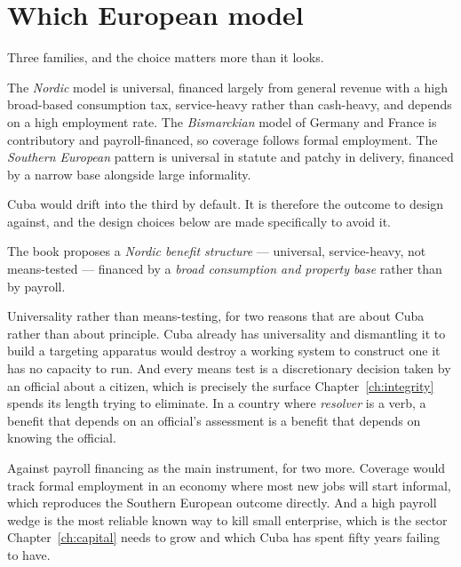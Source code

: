 \section{Which European model}

Three families, and the choice matters more than it looks.

The \emph{Nordic} model is universal, financed largely from general revenue with
a high broad-based consumption tax, service-heavy rather than cash-heavy, and
depends on a high employment rate. The \emph{Bismarckian} model of Germany and
France is contributory and payroll-financed, so coverage follows formal
employment. The \emph{Southern European} pattern is universal in statute and
patchy in delivery, financed by a narrow base alongside large informality.

Cuba would drift into the third by default. It is therefore the outcome to
design against, and the design choices below are made specifically to avoid it.

The book proposes a \emph{Nordic benefit structure} --- universal, service-heavy,
not means-tested --- financed by a \emph{broad consumption and property base}
rather than by payroll.

Universality rather than means-testing, for two reasons that are about Cuba
rather than about principle. Cuba already has universality and dismantling it to
build a targeting apparatus would destroy a working system to construct one it
has no capacity to run. And every means test is a discretionary decision taken
by an official about a citizen, which is precisely the surface
Chapter~\ref{ch:integrity} spends its length trying to eliminate. In a country
where \emph{resolver} is a verb, a benefit that depends on an official's
assessment is a benefit that depends on knowing the official.

Against payroll financing as the main instrument, for two more. Coverage would
track formal employment in an economy where most new jobs will start informal,
which reproduces the Southern European outcome directly. And a high payroll
wedge is the most reliable known way to kill small enterprise, which is the
sector Chapter~\ref{ch:capital} needs to grow and which Cuba has spent fifty
years failing to have.

